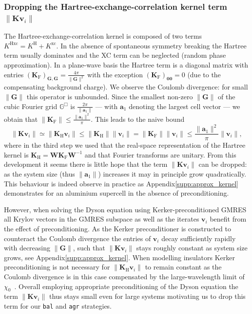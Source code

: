 \documentclass[hidelinks,onefignum,onetabnum]{siamart250211}
\renewcommand{\vec}{\bm}
\newcommand{\KHxc}{K^{\mathrm{Hxc}}}
\newcommand{\G}{\mathbb{G}}
\newcommand{\sbal}{\texttt{bal}\xspace}
\newcommand{\sagr}{\texttt{agr}\xspace}
\newcommand{\supplement}{Appendix\xspace}
\newcommand{\supplement}{Supplementary Material\xspace}
\begin{document}
\subsubsection{Dropping the Hartree-exchange-correlation kernel term \texorpdfstring{$\| \bm{K} \bm{v}_i \|$}{Kvi}}
\label{sec:approx_kernel}
The Hartree-exchange-correlation kernel is
composed of two terms $\KHxc = K^\text{H} + K^\text{xc}$.
In the absence of spontaneous symmetry breaking
%
the Hartree term usually dominates
and the XC term can be neglected (random phase approximation).
%
In a plane-wave basis the Hartree term is a diagonal matrix with entries
$\left(\bm K_{\mathrm F}\right)_{\vec{G},\vec{G}}
= \frac{4\pi}{\| \vec{G}\|^2}$ with the exception
$\left(\bm K_{\mathrm F}\right)_{\bm 0 \bm 0} = 0$
(due to the compensating background charge).
We observe the Coulomb divergence:
for small $\|\bm G\|$ this operator is unbounded.
Since the smallest non-zero $\|\bm G\|$ of the cubic Fourier grid $\G^{\Box}$
is $\frac{2\pi}{\| \bm a_1 \|}$
--- with $\bm a_1$ denoting the largest cell vector ---
we obtain that $\|\bm K_{\mathrm F}\| \leq \frac{\| \bm a_1 \|^2}{\pi}$.
This leads to the naive bound
\begin{equation}
    \label{eq:bound_k_naive}
    \| \bm K \bm v_i \| \simeq \| \bm K_{\mathrm H} \bm v_i \|
    \leq \| \bm K_{\mathrm H} \| \| \bm v_i \|
    = \| \bm K_{\mathrm F} \| \| \bm v_i \|
    \leq \frac{\|\bm a_1\|^2}{\pi} \| \bm v_i \|,
\end{equation}
where in the third step  we used that the real-space representation
of the Hartree kernel is $\bm K_{\mathrm H} = \bm W \bm K_{\mathrm F} \bm W^{-1}$
and that Fourier transforms are unitary.
%
%
%
%
%
%
%
%
%
%
%
%
%
%
%
%
%
From this development it seems there is little hope
that the term $\| \bm K \bm v_i \|$ can be dropped:
as the system size (thus $\| \bm a_1 \|$) increases
it may in principle grow quadratically.
This behaviour is indeed observe in practice
as \supplement \ref{supp:approx_kernel} demonstrates
%
for an aluminium supercell in the absence of preconditioning.

However, when solving the Dyson equation using Kerker-preconditioned GMRES
all Krylov vectors in the GMRES subspace as well as the iterates $\bm v_i$
benefit from the effect of preconditioning.
As the Kerker preconditioner is constructed to counteract the Coulomb
divergence the entries of $\bm v_i$ decay sufficiently
rapidly with decreasing $\|\bm G\|$,
such that $\| \bm K \bm v_i \|$ stays roughly constant as system size grows,
see \supplement \ref{supp:approx_kernel}.
%
When modelling insulators Kerker preconditioning is not necessary
for $\| \bm K_{\mathrm H} \bm v_i \|$ to remain constant
as the Coulomb divergence is in this case
compensated by the large-wavelength limit of
$\chi_0$~\cite{herbstBlackboxInhomogeneousPreconditioning2020,cances2010dielectric}.
%
%
%
%
%
%
%
%
%
%
%
%
%
%
%
%
Overall employing appropriate preconditioning of the Dyson equation
the term $\| \bm K \bm v_i \|$ thus stays small even for large systems
motivating us to drop this term for our \sbal and \sagr strategies.
\end{document}
